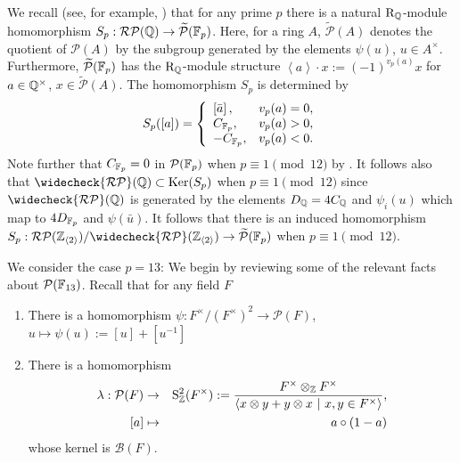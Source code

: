 \documentclass[12pt]{amsart}
\theoremstyle{definition}
\newcommand{\Q}{\Bbb{Q}}
\newcommand{\F}[1]{\Bbb{F}_{#1}}
\newcommand{\Z}{\Bbb{Z}}
\newcommand{\pb}[1]{\mathcal{P}(#1)}%
\newcommand{\qpb}[1]{\widetilde{\mathcal{P}}(#1)}%
\newcommand{\rpb}[1]{\mathcal{RP}(#1)}%
\newcommand{\crpb}[1]{\widecheck{\mathcal{RP}}(#1)}
\newcommand{\bl}[1]{\mathcal{B}(#1)}%
\newcommand{\gpb}[1]{\left[ #1\right]} %
\newcommand{\sus}[1]{\psi(#1) }%
\newcommand{\suss}[2]{\psi_{#1}\left( #2\right)}
\newcommand{\bconst}[1]{C_{#1}}
\newcommand{\cconst}[1]{D_{#1}}
\newcommand{\<}{\langle}
\renewcommand{\>}{\rangle}
\renewcommand{\ker}[1]{\mathrm{Ker}(#1)}
\newcommand{\sgr}[1]{\mathrm{R}_{#1}}%
\newcommand{\an}[1]{\left\langle{#1}\right\rangle}
\newcommand{\asym}[3]{\mathrm{S}^{#1}_{#2}(#3)}
\begin{document}
We recall (see, for example, \cite[Section 3.2]{hut:sl2Q}) that for any prime $p$ there is a natural $\sgr{\Q}$-module homomorphism $S_p:\rpb{\Q}\to\qpb{\F{p}}$. Here, for a ring $A$, $\qpb{A}$ denotes the quotient
of $\pb{A}$ by the subgroup generated by the elements $\sus{u}$, $u\in A^\times$. Furthermore, $\qpb{\F{p}}$ has the $\sgr{\Q}$-module structure $\an{a}\cdot x:= (-1)^{v_p(a)}x$ for 
$a\in \Q^\times$, $x\in \qpb{A}$. The homomorphism $S_p$ is determined   by 
\[
S_p(\gpb{a})=
\left\{
\begin{array}{ll}
\gpb{\bar{a}}, & v_p(a)=0,\\
\bconst{\F{p}},& v_p(a)>0,\\
-\bconst{\F{p}},& v_p(a)<0.\\
\end{array}
\right.
\]
Note further that $\bconst{\F{p}}=0$ in $\pb{\F{p}}$ when $p\equiv 1\pmod{12}$ by \cite[Lemma 7.11]{hut:cplx13}. It follows also that $\crpb{\Q}\subset \ker{S_p}$ when $p\equiv 1\pmod{12}$ since $\crpb{\Q}$ is generated by the elements $\cconst{\Q}=4\bconst{\Q}$ and $\suss{i}{u}$ which map to $4\cconst{\F{p}}$ and $\sus{\bar{u}}$. It follows that there is an induced homomorphism $S_p:\rpb{\Z_{\an{2}}}/\crpb{\Z_{\an{2}}}\to \qpb{\F{p}}$ when $p\equiv 1\pmod{12}$.

We consider the case $p=13$:  We begin by reviewing some of the relevant facts about $\pb{\F{13}}$. Recall that for any field $F$ 
\begin{enumerate}
\item There is a homomorphism
$\psi:F^\times/(F^\times)^2\to \pb{F}$, $u\mapsto \sus{u}:=\gpb{u}+\gpb{u^{-1}}$ 
\item There is a homomorphism 
\begin{eqnarray*}
\lambda:\pb{F}&\to &\asym{2}{\Z}{F^\times}:=\frac{F^\times\otimes_{\Z}F^\times}{\an{ x\otimes y+y\otimes x\ |\ x,y\in F^\times}},\\
 \gpb{a}&\mapsto & a\circ (1-a)\\
\end{eqnarray*}
whose kernel is $\bl{F}$.
\end{enumerate}
\end{document}
